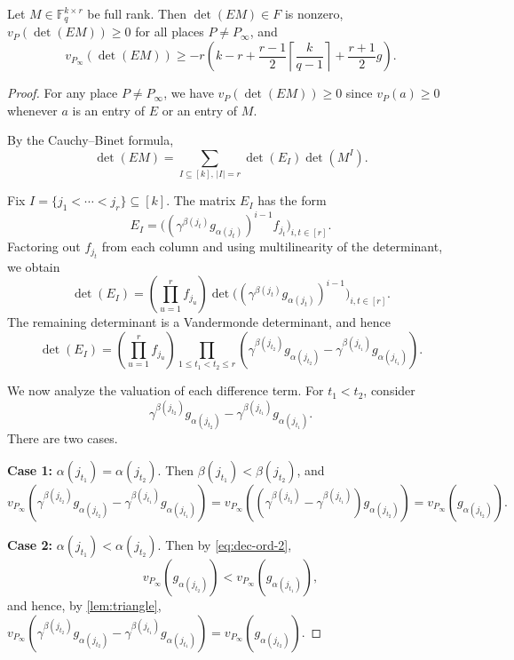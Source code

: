 \documentclass[11pt]{article}
\begin{document}
\begin{lemma}\label{lem:FS-deg}
Let $M\in \mathbb{F}_q^{k\times r}$ be full rank. Then $\det(EM)\in F$ is nonzero, $v_P(\det(EM))\geq 0$ for all places $P\neq P_\infty$, and 
\[
v_{P_\infty}(\det(EM))\geq -r\left(
k-r+\frac{r-1}{2}\left\lceil \frac{k}{q-1}\right\rceil+\frac{r+1}{2}g 
\right).
\]
\end{lemma}
\begin{proof}
For any place $P\neq P_\infty$, we have $v_P(\det(EM))\geq 0$ since $v_P(a)\geq 0$ whenever $a$ is an entry of $E$ or an entry of $M$.

By the Cauchy--Binet formula,
\[
\det(EM)=\sum_{I\subseteq [k],\, |I|=r}\det(E_I)\det(M^I).
\]

Fix $I=\{j_1<\cdots<j_r\}\subseteq [k]$. The matrix $E_I$ has the form
\[
E_I=\bigl((\gamma^{\beta(j_t)} g_{\alpha(j_t)})^{i-1} f_{j_t}\bigr)_{i,t\in [r]}.
\]
Factoring out $f_{j_t}$ from each column and using multilinearity of the determinant, we obtain
\[
\det(E_I)=\left(\prod_{u=1}^r f_{j_u}\right)
\det\bigl((\gamma^{\beta(j_t)} g_{\alpha(j_t)})^{i-1}\bigr)_{i,t\in [r]}.
\]
The remaining determinant is a Vandermonde determinant, and hence
\begin{equation}\label{eq:expansion-EI}
\det(E_I)=\left(\prod_{u=1}^r f_{j_u}\right)
\prod_{1\le t_1<t_2\le r}
\left(\gamma^{\beta(j_{t_2})} g_{\alpha(j_{t_2})}-\gamma^{\beta(j_{t_1})} g_{\alpha(j_{t_1})}\right).
\end{equation}

\medskip
We now analyze the valuation of each difference term. For $t_1<t_2$, consider
\[
\gamma^{\beta(j_{t_2})} g_{\alpha(j_{t_2})}
-
\gamma^{\beta(j_{t_1})} g_{\alpha(j_{t_1})}.
\]
There are two cases.

\smallskip
\noindent\textbf{Case 1:} $\alpha(j_{t_1})=\alpha(j_{t_2})$.
Then $\beta(j_{t_1})<\beta(j_{t_2})$, and
\[
v_{P_\infty}\!\left(
\gamma^{\beta(j_{t_2})} g_{\alpha(j_{t_2})}
-
\gamma^{\beta(j_{t_1})} g_{\alpha(j_{t_1})}
\right)
=
v_{P_\infty}\!\left(
(\gamma^{\beta(j_{t_2})}-\gamma^{\beta(j_{t_1})}) g_{\alpha(j_{t_2})}
\right)
=
v_{P_\infty}(g_{\alpha(j_{t_2})}).
\]

\smallskip
\noindent\textbf{Case 2:} $\alpha(j_{t_1})<\alpha(j_{t_2})$.
Then by \eqref{eq:dec-ord-2},
\[
v_{P_\infty}(g_{\alpha(j_{t_2})})<v_{P_\infty}(g_{\alpha(j_{t_1})}),
\]
and hence, by \cref{lem:triangle},  $v_{P_\infty}\!\left(
\gamma^{\beta(j_{t_2})} g_{\alpha(j_{t_2})}
-
\gamma^{\beta(j_{t_1})} g_{\alpha(j_{t_1})}
\right)
=
v_{P_\infty}(g_{\alpha(j_{t_2})})$.


\end{proof}
\end{document}
